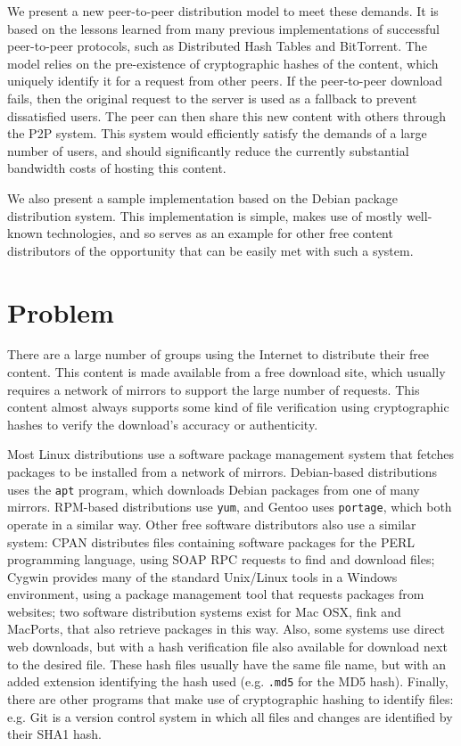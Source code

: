 \documentclass[conference]{IEEEtran}
\begin{document}
We present a new peer-to-peer distribution model to meet these
demands. It is based on the lessons learned from many previous
implementations of successful peer-to-peer protocols, such as
Distributed Hash Tables and BitTorrent.
The model relies on the pre-existence of cryptographic
hashes of the content, which uniquely identify it for a request from
other peers. If the peer-to-peer download fails, then the original
request to the server is used as a fallback to prevent dissatisfied
users. The peer can then share this new content with others through
the P2P system. This system would efficiently satisfy the demands of
a large number of users, and should significantly reduce the
currently substantial bandwidth costs of hosting this content.

We also present a sample implementation based on the Debian package
distribution system. This implementation is simple, makes use of
mostly well-known technologies, and so serves as an example for
other free content distributors of the opportunity that can be easily met
with such a system.

\section{Problem}

There are a large number of groups using the Internet to distribute
their free content. This content is made available from a free
download site, which usually requires a network of mirrors to
support the large number of requests. This content almost always
supports some kind of file verification using cryptographic hashes
to verify the download's accuracy or authenticity.

Most Linux distributions use a software package management system
that fetches packages to be installed from a network of mirrors.
Debian-based distributions uses the \texttt{apt} program, which
downloads Debian packages from one of many mirrors. RPM-based
distributions use \texttt{yum}, and Gentoo uses \texttt{portage},
which both operate in a similar way. Other free software
distributors also use a similar system: CPAN distributes files
containing software packages for the PERL programming language,
using SOAP RPC requests to find and download files; Cygwin provides
many of the standard Unix/Linux tools in a Windows environment,
using a package management tool that requests packages from
websites; two software distribution systems exist for Mac OSX,
fink and MacPorts, that also retrieve packages in this way. Also,
some systems use direct web downloads, but with a hash verification
file also available for download next to the desired file. These
hash files usually have the same file name, but with an added
extension identifying the hash used (e.g. \texttt{.md5} for the MD5
hash). Finally, there are other programs that make use of
cryptographic hashing to identify files: e.g. Git is a version
control system in which all files and changes are identified by
their SHA1 hash.
\end{document}
